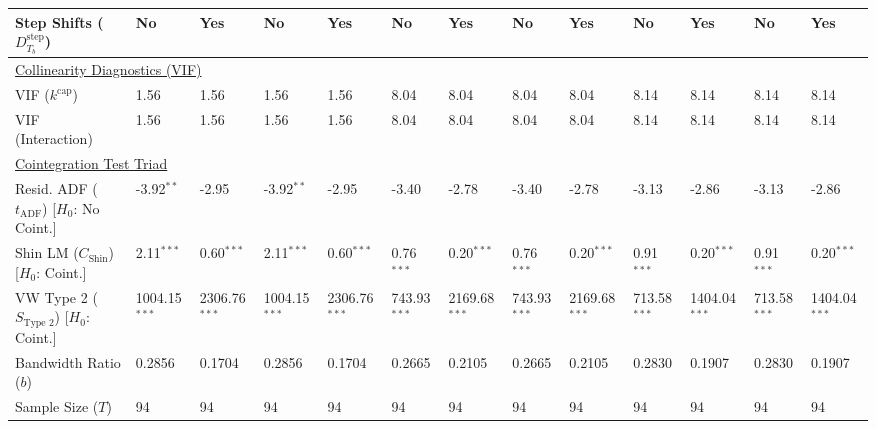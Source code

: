 \begin{table}[H]
\begin{tabular}{p{3.8cm}p{1.5cm}p{1.5cm}p{1.5cm}p{1.5cm}p{1.5cm}p{1.5cm}p{1.5cm}p{1.5cm}p{1.5cm}p{1.5cm}p{1.5cm}p{1.5cm}}
Step Shifts ($D^{\text{step}}_{T_b}$)  & No & Yes & No & Yes & No & Yes & No & Yes & No & Yes & No & Yes  \\
\midrule
\multicolumn{13}{l}{\underline{Collinearity Diagnostics (VIF)}} \\
VIF ($k^{\text{cap}}$) & 1.56 & 1.56 & 1.56 & 1.56 & 8.04 & 8.04 & 8.04 & 8.04 & 8.14 & 8.14 & 8.14 & 8.14  \\
VIF (Interaction) & 1.56 & 1.56 & 1.56 & 1.56 & 8.04 & 8.04 & 8.04 & 8.04 & 8.14 & 8.14 & 8.14 & 8.14  \\
\midrule
\multicolumn{13}{l}{\underline{Cointegration Test Triad}} \\
\makecell[l]{Resid. ADF ($t_{\text{ADF}}$) \\ {\scriptsize [$H_0$: No Coint.]}} & -3.92$^{**}$ & -2.95 & -3.92$^{**}$ & -2.95 & -3.40 & -2.78 & -3.40 & -2.78 & -3.13 & -2.86 & -3.13 & -2.86  \\
\makecell[l]{Shin LM ($C_{\text{Shin}}$) \\ {\scriptsize [$H_0$: Coint.]}} & 2.11$^{***}$ & 0.60$^{***}$ & 2.11$^{***}$ & 0.60$^{***}$ & 0.76$^{***}$ & 0.20$^{***}$ & 0.76$^{***}$ & 0.20$^{***}$ & 0.91$^{***}$ & 0.20$^{***}$ & 0.91$^{***}$ & 0.20$^{***}$  \\
\makecell[l]{VW Type 2 ($S_{\text{Type 2}}$) \\ {\scriptsize [$H_0$: Coint.]}} & 1004.15$^{***}$ & 2306.76$^{***}$ & 1004.15$^{***}$ & 2306.76$^{***}$ & 743.93$^{***}$ & 2169.68$^{***}$ & 743.93$^{***}$ & 2169.68$^{***}$ & 713.58$^{***}$ & 1404.04$^{***}$ & 713.58$^{***}$ & 1404.04$^{***}$  \\
\midrule
Bandwidth Ratio ($b$) & 0.2856 & 0.1704 & 0.2856 & 0.1704 & 0.2665 & 0.2105 & 0.2665 & 0.2105 & 0.2830 & 0.1907 & 0.2830 & 0.1907  \\
Sample Size ($T$) & 94 & 94 & 94 & 94 & 94 & 94 & 94 & 94 & 94 & 94 & 94 & 94  \\
\bottomrule

\end{tabular}
\end{table}
